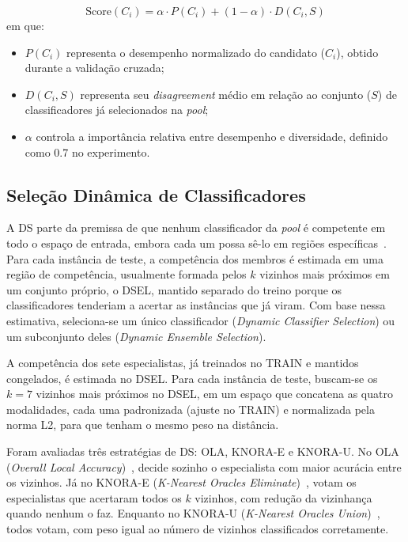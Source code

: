 \documentclass[conference]{IEEEtran}
\begin{document}
\begin{equation}
\label{eq:score_candidato}
\text{Score}(C_i) = \alpha \cdot P(C_i) + (1 - \alpha) \cdot D(C_i, S)
\end{equation}
em que:
\begin{itemize}
    \item $P(C_i)$ representa o desempenho normalizado do candidato ($C_i$), obtido durante a validação cruzada;
    \item $D(C_i, S)$ representa seu \textit{disagreement} médio em relação ao conjunto ($S$) de classificadores já selecionados na \textit{pool};
    \item $\alpha$ controla a importância relativa entre desempenho e diversidade, definido como 0.7 no experimento.
\end{itemize}



\subsection{Seleção Dinâmica de Classificadores}
A DS parte da premissa de que nenhum classificador da \textit{pool} é competente em todo o espaço de entrada, embora cada um possa sê-lo em regiões específicas~\cite{britto2014dynamic, cruz2018dynamic}. Para cada instância de teste, a competência dos membros é estimada em uma região de competência, usualmente formada pelos $k$ vizinhos mais próximos em um conjunto próprio, o DSEL, mantido separado do treino porque os classificadores tenderiam a acertar as instâncias que já viram. Com base nessa estimativa, seleciona-se um único classificador (\textit{Dynamic Classifier Selection}) ou um subconjunto deles (\textit{Dynamic Ensemble Selection}).

A competência dos sete especialistas, já treinados no TRAIN e mantidos congelados, é estimada no DSEL. Para cada instância de teste, buscam-se os $k = 7$ vizinhos mais próximos no DSEL, em um espaço que concatena as quatro modalidades, cada uma padronizada (ajuste no TRAIN) e normalizada pela norma L2, para que tenham o mesmo peso na distância.

Foram avaliadas três estratégias de DS: OLA, KNORA-E e KNORA-U. No OLA (\textit{Overall Local Accuracy})~\cite{woods1997combination}, decide sozinho o especialista com maior acurácia entre os vizinhos. Já no KNORA-E (\textit{K-Nearest Oracles Eliminate})~\cite{ko2008dynamic}, votam os especialistas que acertaram todos os $k$ vizinhos, com redução da vizinhança quando nenhum o faz. Enquanto no KNORA-U (\textit{K-Nearest Oracles Union})~\cite{ko2008dynamic}, todos votam, com peso igual ao número de vizinhos classificados corretamente.
\end{document}
